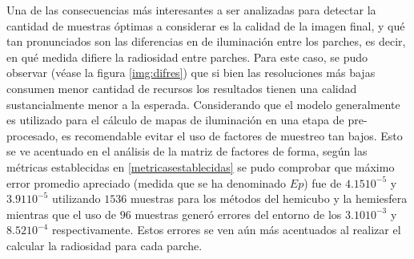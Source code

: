 
Una de las consecuencias más interesantes a ser analizadas para detectar la cantidad de muestras óptimas a considerar es la calidad de la imagen final, y qué tan pronunciados son las diferencias en de iluminación entre los parches, es decir, en qué medida difiere la radiosidad entre parches. Para este caso, se pudo observar (véase la figura \ref{img:difres}) que si bien las resoluciones más bajas consumen menor cantidad de recursos los resultados tienen una calidad sustancialmente menor a la esperada. Considerando que el modelo generalmente es utilizado para el cálculo de mapas de iluminación en una etapa de pre-procesado, es recomendable evitar el uso de factores de muestreo tan bajos. Esto se ve acentuado en el análisis de la matriz de factores de forma, según las métricas establecidas en \ref{metricasestablecidas} se pudo comprobar que máximo error promedio apreciado (medida que se ha denominado $Ep$) fue de $4.15 10^{-5}$ y $3.91 10^{-5}$ utilizando $1536$ muestras para los métodos del hemicubo y la hemiesfera mientras que el uso de $96$ muestras generó errores del entorno de los $3.10 10^{-3}$ y $8.52 10^{-4}$ respectivamente. Estos errores se ven aún más acentuados al realizar el calcular la radiosidad para cada parche.

